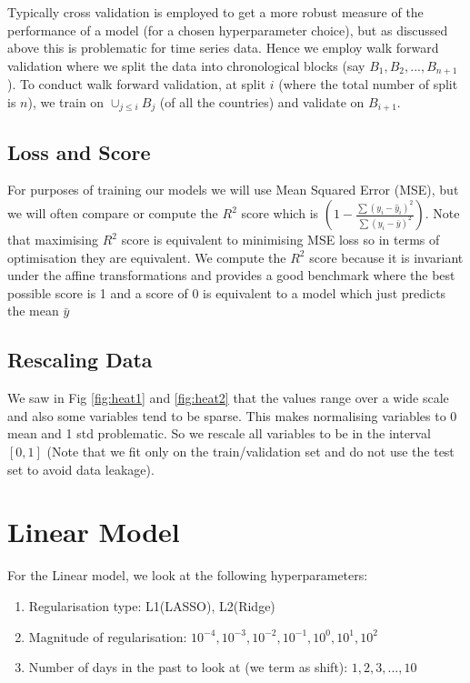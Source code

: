 \documentclass{article}
\begin{document}
Typically cross validation is employed to get a more robust measure of the performance of a model (for a chosen hyperparameter choice), but as discussed above this is problematic for time series data. Hence we employ walk forward validation where we split the data into chronological blocks  (say $B_1, B_2, ..., B_{n+1}$). To conduct walk forward validation, at split $i$ (where the total number of split is $n$), we train on $\cup_{j\leq i}B_j$ (of all the countries) and validate on $B_{i+1}$. 

\subsection{Loss and Score}

For purposes of training our models we will use Mean Squared Error (MSE), but we will often compare or compute the $R^2$ score which is $\left(1 -\frac{\sum (y_i - \hat{y}_i)^2}{\sum (y_i - \bar{y})^2}\right)$. Note that maximising $R^2$ score is equivalent to minimising MSE loss so in terms of optimisation they are equivalent. We compute the $R^2$ score because it is invariant under the affine transformations and provides a good benchmark where the best possible score is 1 and a score of 0 is equivalent to a model which just predicts the mean $\bar{y}$

\subsection{Rescaling Data}

We saw in Fig \ref{fig:heat1} and \ref{fig:heat2} that the values range over a wide scale and also some variables tend to be sparse. This makes normalising variables to 0 mean and 1 std problematic. So we rescale all variables to be in the interval $[0,1]$ (Note that we fit only on the train/validation  set and do not use the test set to avoid data leakage).

\section{Linear Model}

For the Linear model, we look at the following hyperparameters:

\begin{enumerate}
\item Regularisation type: L1(LASSO), L2(Ridge) 
\item Magnitude of regularisation: $10^{-4}, 10^{-3}, 10^{-2}, 10^{-1}, 10^{0}, 10^{1}, 10^{2}$
\item Number of days in the past to look at (we term as shift): $1, 2, 3, ..., 10$
\end{enumerate}
\end{document}
